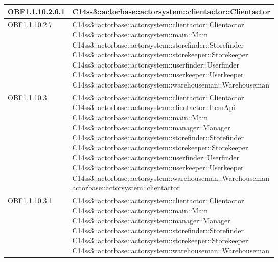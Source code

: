 \documentclass{scalatekids-article}
\begin{document}
\begin{longtable}[H]{|p{4.5cm}|p{13cm}|}
\hline
OBF1.1.10.2.6.1 & \multiLineCell[t]{C14ss3::actorbase::actorsystem::clientactor::Clientactor\\}\\
\hline
OBF1.1.10.2.7 & \multiLineCell[t]{C14ss3::actorbase::actorsystem::clientactor::Clientactor\\C14ss3::actorbase::actorsystem::main::Main\\C14ss3::actorbase::actorsystem::storefinder::Storefinder\\C14ss3::actorbase::actorsystem::storekeeper::Storekeeper\\C14ss3::actorbase::actorsystem::userfinder::Userfinder\\C14ss3::actorbase::actorsystem::userkeeper::Userkeeper\\C14ss3::actorbase::actorsystem::warehouseman::Warehouseman\\}\\
\hline
OBF1.1.10.3 & \multiLineCell[t]{C14ss3::actorbase::actorsystem::clientactor::Clientactor\\C14ss3::actorbase::actorsystem::clientactor::ItemApi\\C14ss3::actorbase::actorsystem::main::Main\\C14ss3::actorbase::actorsystem::manager::Manager\\C14ss3::actorbase::actorsystem::storefinder::Storefinder\\C14ss3::actorbase::actorsystem::storekeeper::Storekeeper\\C14ss3::actorbase::actorsystem::userfinder::Userfinder\\C14ss3::actorbase::actorsystem::userkeeper::Userkeeper\\C14ss3::actorbase::actorsystem::warehouseman::Warehouseman\\actorbase::actorsystem::clientactor\\}\\
\hline
OBF1.1.10.3.1 & \multiLineCell[t]{C14ss3::actorbase::actorsystem::clientactor::Clientactor\\C14ss3::actorbase::actorsystem::main::Main\\C14ss3::actorbase::actorsystem::manager::Manager\\C14ss3::actorbase::actorsystem::storefinder::Storefinder\\C14ss3::actorbase::actorsystem::storekeeper::Storekeeper\\C14ss3::actorbase::actorsystem::warehouseman::Warehouseman\\}\\

\end{longtable}
\end{document}
